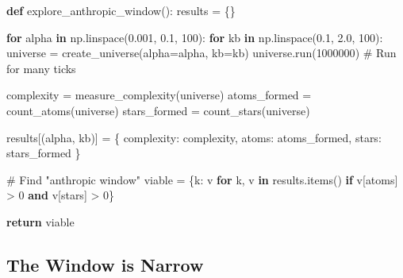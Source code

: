 \documentclass[
  11pt,
  letterpaper,
  twoside,
  openright]{book}
\newenvironment{Shaded}{\begin{snugshade}}{\end{snugshade}}
\newcommand{\CommentTok}[1]{\textcolor[rgb]{0.37,0.37,0.37}{#1}}
\newcommand{\ControlFlowTok}[1]{\textcolor[rgb]{0.00,0.23,0.31}{\textbf{#1}}}
\newcommand{\DecValTok}[1]{\textcolor[rgb]{0.68,0.00,0.00}{#1}}
\newcommand{\FloatTok}[1]{\textcolor[rgb]{0.68,0.00,0.00}{#1}}
\newcommand{\KeywordTok}[1]{\textcolor[rgb]{0.00,0.23,0.31}{\textbf{#1}}}
\newcommand{\NormalTok}[1]{\textcolor[rgb]{0.00,0.23,0.31}{#1}}
\newcommand{\OperatorTok}[1]{\textcolor[rgb]{0.37,0.37,0.37}{#1}}
\newcommand{\StringTok}[1]{\textcolor[rgb]{0.13,0.47,0.30}{#1}}
\begin{document}
\begin{Shaded}
\begin{Highlighting}[]
\KeywordTok{def}\NormalTok{ explore\_anthropic\_window():}
\NormalTok{    results }\OperatorTok{=}\NormalTok{ \{\}}

    \ControlFlowTok{for}\NormalTok{ alpha }\KeywordTok{in}\NormalTok{ np.linspace(}\FloatTok{0.001}\NormalTok{, }\FloatTok{0.1}\NormalTok{, }\DecValTok{100}\NormalTok{):}
        \ControlFlowTok{for}\NormalTok{ kb }\KeywordTok{in}\NormalTok{ np.linspace(}\FloatTok{0.1}\NormalTok{, }\FloatTok{2.0}\NormalTok{, }\DecValTok{100}\NormalTok{):}
\NormalTok{            universe }\OperatorTok{=}\NormalTok{ create\_universe(alpha}\OperatorTok{=}\NormalTok{alpha, kb}\OperatorTok{=}\NormalTok{kb)}
\NormalTok{            universe.run(}\DecValTok{1000000}\NormalTok{)  }\CommentTok{\# Run for many ticks}

\NormalTok{            complexity }\OperatorTok{=}\NormalTok{ measure\_complexity(universe)}
\NormalTok{            atoms\_formed }\OperatorTok{=}\NormalTok{ count\_atoms(universe)}
\NormalTok{            stars\_formed }\OperatorTok{=}\NormalTok{ count\_stars(universe)}

\NormalTok{            results[(alpha, kb)] }\OperatorTok{=}\NormalTok{ \{}
                \StringTok{\textquotesingle{}complexity\textquotesingle{}}\NormalTok{: complexity,}
                \StringTok{\textquotesingle{}atoms\textquotesingle{}}\NormalTok{: atoms\_formed,}
                \StringTok{\textquotesingle{}stars\textquotesingle{}}\NormalTok{: stars\_formed}
\NormalTok{            \}}

    \CommentTok{\# Find "anthropic window"}
\NormalTok{    viable }\OperatorTok{=}\NormalTok{ \{k: v }\ControlFlowTok{for}\NormalTok{ k, v }\KeywordTok{in}\NormalTok{ results.items()}
              \ControlFlowTok{if}\NormalTok{ v[}\StringTok{\textquotesingle{}atoms\textquotesingle{}}\NormalTok{] }\OperatorTok{\textgreater{}} \DecValTok{0} \KeywordTok{and}\NormalTok{ v[}\StringTok{\textquotesingle{}stars\textquotesingle{}}\NormalTok{] }\OperatorTok{\textgreater{}} \DecValTok{0}\NormalTok{\}}

    \ControlFlowTok{return}\NormalTok{ viable}
\end{Highlighting}
\end{Shaded}

\subsection{The Window is Narrow}\label{the-window-is-narrow}
\end{document}
